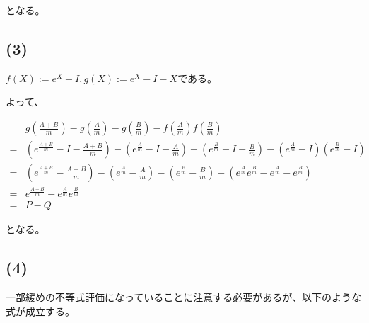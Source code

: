 \documentclass[a4paper, 10pt, dvipdfmx]{jlreq}
\begin{document}
となる。

\subsection*{(3)}

$f(X):=e^X-I,g(X):=e^X-I-X$である。

よって、

\begin{align*}
    & g\left(\frac{A+B}{m}\right)-g\left(\frac{A}{m}\right)-g\left(\frac{B}{m}\right)-f\left(\frac{A}{m}\right)f\left(\frac{B}{m}\right)                                                                         \\
  = & \left(e^{\frac{A+B}{m}}-I-\frac{A+B}{m}\right)-\left(e^{\frac{A}{m}}-I-\frac{A}{m}\right)-\left(e^{\frac{B}{m}}-I-\frac{B}{m}\right)-\left(e^{\frac{A}{m}}-I\right)\left(e^{\frac{B}{m}}-I\right)          \\
  = & \left(e^{\frac{A+B}{m}}-\frac{A+B}{m}\right)-\left(e^{\frac{A}{m}}-\frac{A}{m}\right)-\left(e^{\frac{B}{m}}-\frac{B}{m}\right)-\left(e^{\frac{A}{m}}e^{\frac{B}{m}}-e^{\frac{A}{m}}-e^{\frac{B}{m}}\right) \\
  = & e^{\frac{A+B}{m}}-e^{\frac{A}{m}}e^{\frac{B}{m}}                                                                                                                                                           \\
  = & P-Q
\end{align*}

となる。

\subsection*{(4)}

一部緩めの不等式評価になっていることに注意する必要があるが、以下のような式が成立する。
\end{document}
